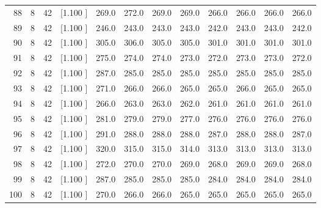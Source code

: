 \documentclass[12pt,a4paper]{article}
\begin{document}
\begin{center}
{\begin{tabular}{r r r r r r r r r r r r}
  88&  8& 42&[1.100     ]&   269.0&   272.0&   269.0&   269.0&   266.0&   266.0&   266.0&   266.0\\[-0.02in]
  89&  8& 42&[1.100     ]&   246.0&   243.0&   243.0&   243.0&   242.0&   243.0&   243.0&   242.0\\[-0.02in]
  90&  8& 42&[1.100     ]&   305.0&   306.0&   305.0&   305.0&   301.0&   301.0&   301.0&   301.0\\[-0.02in]
  91&  8& 42&[1.100     ]&   275.0&   274.0&   274.0&   273.0&   272.0&   273.0&   273.0&   272.0\\[-0.02in]
  92&  8& 42&[1.100     ]&   287.0&   285.0&   285.0&   285.0&   285.0&   285.0&   285.0&   285.0\\[-0.02in]
  93&  8& 42&[1.100     ]&   271.0&   266.0&   266.0&   265.0&   265.0&   266.0&   265.0&   265.0\\[-0.02in]
  94&  8& 42&[1.100     ]&   266.0&   263.0&   263.0&   262.0&   261.0&   261.0&   261.0&   261.0\\[-0.02in]
  95&  8& 42&[1.100     ]&   281.0&   279.0&   279.0&   277.0&   276.0&   276.0&   276.0&   276.0\\[-0.02in]
  96&  8& 42&[1.100     ]&   291.0&   288.0&   288.0&   288.0&   287.0&   288.0&   288.0&   287.0\\[-0.02in]
  97&  8& 42&[1.100     ]&   320.0&   315.0&   315.0&   314.0&   313.0&   313.0&   313.0&   313.0\\[-0.02in]
  98&  8& 42&[1.100     ]&   272.0&   270.0&   270.0&   269.0&   268.0&   269.0&   269.0&   268.0\\[-0.02in]
  99&  8& 42&[1.100     ]&   287.0&   285.0&   285.0&   285.0&   284.0&   284.0&   284.0&   284.0\\[-0.02in]
 100&  8& 42&[1.100     ]&   270.0&   266.0&   266.0&   265.0&   265.0&   265.0&   265.0&   265.0\\[-0.02in]

\hline
\end{tabular}}
\end{center}
\end{document}
